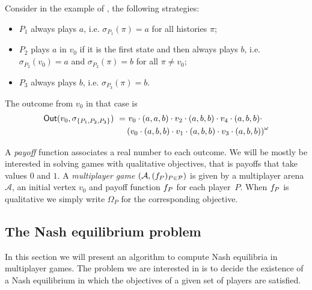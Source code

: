 \begin{example}
  Consider in the example of , the following
  strategies:
  \begin{itemize}
  \item $P_1$ always plays $a$, i.e. $\sigma_{P_1}(\pi) = a$ for all histories $\pi$;
  \item $P_2$ plays $a$ in $v_0$ if it is the first state and then always plays $b$, i.e. $\sigma_{P_2}(v_0) = a$ and $\sigma_{P_2}(\pi) = b$ for all $\pi \ne v_0$;
  \item $P_3$ always plays $b$, i.e. $\sigma_{P_3}(\pi) = b$.
  \end{itemize}
  The outcome from $v_0$ in that case is
  \begin{align*}
    \textsf{Out}(v_0, \sigma_{\{P_1, P_2, P_3\}}) ~ = & ~ v_0 \cdot (a, a, b) \cdot v_2 \cdot (a, b, b)
                                                \cdot v_4 \cdot (a, b, b) \cdot\\
                                              & \left(v_0 \cdot (a, b, b)
                                                \cdot v_1 \cdot (a, b, b)
                                                \cdot v_3 \cdot (a, b, b)\right)^\omega
  \end{align*}
\end{example}


\begin{definition}
  A \emph{payoff} function associates a real number to each outcome.
  We will be mostly be interested in solving games with qualitative
  objectives, that is payoffs that take values $0$ and $1$.
  A \emph{multiplayer game} \((\mathcal{A}, (f_P)_{P \in \mathcal{P}})\) is given by a multiplayer arena $\mathcal{A}$, an initial
  vertex $v_0$ and payoff function $f_P$ for each player~$P$.
  When $f_P$ is qualitative we simply write $\Omega_P$
  for the corresponding objective.
\end{definition}


\subsection{The Nash equilibrium problem}
\label{14-subsection:algorithm-for-finding-nash-equilibria}

In this section we will present an algorithm to compute
Nash equilibria in
multiplayer games.
The problem we are interested in is to decide the existence of a Nash
equilibrium in which the objectives of a given set of players are
satisfied.

